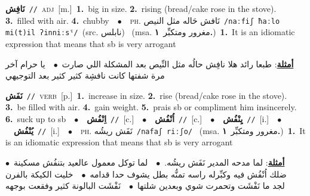 \documentclass[10pt,a4paper,twoside]{article} %
\begin{document}
\begin{multicols}{2}
{\setlength\topsep{0pt}\textbf{\foreignlanguage{arabic}{نَافِش}}\ {\color{gray}\texttt{//}\color{black}}\ \textsc{adj}\ [m.]\ \textbf{1.}~big in size.  \textbf{2.}~rising (bread/cake rose in the stove).  \textbf{3.}~filled with air.  \textbf{4.}~chubby\ \ $\bullet$\ \ \textsc{ph.} \color{gray} \foreignlanguage{arabic}{نَافش حَاله مثل النيص}\color{black}\ {\color{gray}\texttt{/{\sffamily naːfiʃ ħaːlo mi(t)il ʔinniːsˤ}/}\color{black}}\ \color{gray}(src. \foreignlanguage{arabic}{نابلس})\color{black}\ \color{gray} (msa. \foreignlanguage{arabic}{مغرور ومتكبِّر}~\foreignlanguage{arabic}{\textbf{١.}})\color{black}\ \textbf{1.}~It is an idiomatic expression that means that sb is very arrogant\  \begin{flushright}\color{gray}\foreignlanguage{arabic}{\textbf{\underline{\foreignlanguage{arabic}{أمثلة}}}: طبعا رائد هلا نافِش حالُه مثل النِّيص بعد المشكلة اللي صارت\ $\bullet$\ \  يا حرام آخر مرة شفتها كانت نافشِة كثير كثير بعد التوجيهي}\end{flushright}\color{black}} \vspace{2mm}

{\setlength\topsep{0pt}\textbf{\foreignlanguage{arabic}{نَفَش}}\ {\color{gray}\texttt{//}\color{black}}\ \textsc{verb}\ [p.]\ \textbf{1.}~increase in size.  \textbf{2.}~rise (bread/cake rose in the stove).  \textbf{3.}~be filled with air.  \textbf{4.}~gain weight.  \textbf{5.}~prais sb or compliment him insincerely.  \textbf{6.}~suck up to sb\ \ $\bullet$\ \ \setlength\topsep{0pt}\textbf{\foreignlanguage{arabic}{اِنْفُش}}\ {\color{gray}\texttt{//}\color{black}}\ [c.]\ \ $\bullet$\ \ \setlength\topsep{0pt}\textbf{\foreignlanguage{arabic}{اُنْفُش}}\ {\color{gray}\texttt{//}\color{black}}\ [c.]\ \ $\bullet$\ \ \setlength\topsep{0pt}\textbf{\foreignlanguage{arabic}{يِنْفُش}}\ {\color{gray}\texttt{//}\color{black}}\ [i.]\ \ $\bullet$\ \ \setlength\topsep{0pt}\textbf{\foreignlanguage{arabic}{يُنْفُش}}\ {\color{gray}\texttt{//}\color{black}}\ [i.]\ \ $\bullet$\ \ \textsc{ph.} \color{gray} \foreignlanguage{arabic}{نَفَش ريشُه}\color{black}\ {\color{gray}\texttt{/{\sffamily nafaʃ riːʃo}/}\color{black}}\ \color{gray} (msa. \foreignlanguage{arabic}{مغرور ومتكبِّر}~\foreignlanguage{arabic}{\textbf{١.}})\color{black}\ \textbf{1.}~It is an idiomatic expression that means that sb is very arrogant\  \begin{flushright}\color{gray}\foreignlanguage{arabic}{\textbf{\underline{\foreignlanguage{arabic}{أمثلة}}}: لما مدحه المدير نَفَش ريشُه.\ $\bullet$\ \  لما توكل معمول عالعيد بتنفُش مسكينة\ $\bullet$\ \  ضلك اُنْفُش فيه وكبِّرله راسه تمنُّه بطل يشوف حدا قدامه\ $\bullet$\ \  خليت الكيكة بالفرن لجد ما نَفْشَت وتحمرت شوي وبعدين شلتها\ $\bullet$\ \  نَفْشَت البالونة كثير وفقعت بوجهه}\end{flushright}\color{black}} \vspace{2mm}


\end{multicols}
\end{document}
